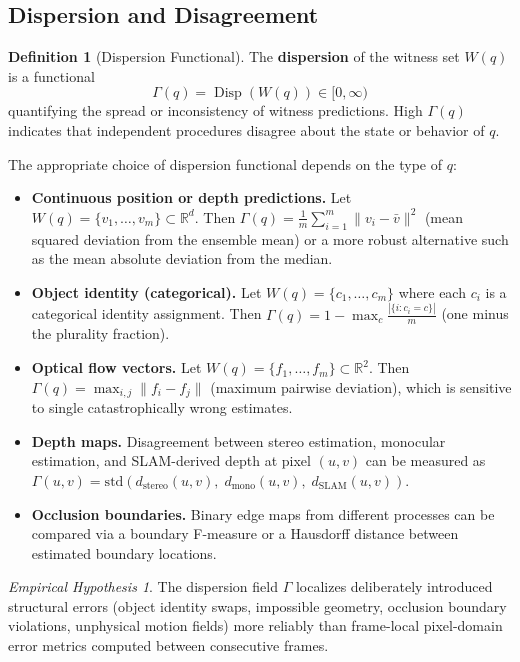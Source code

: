 \documentclass[12pt,a4paper]{article}
\theoremstyle{plain}
\theoremstyle{definition}
\newtheorem{definition}[theorem]{Definition}
\theoremstyle{remark}
\newtheorem{hypothesis}[theorem]{Empirical Hypothesis}
\DeclareMathOperator{\Disp}{Disp}
\begin{document}
\subsection{Dispersion and Disagreement}

\begin{definition}[Dispersion Functional]
The \textbf{dispersion} of the witness set $W(q)$ is a functional
\[
\Gamma(q) = \Disp(W(q)) \in [0, \infty)
\]
quantifying the spread or inconsistency of witness predictions. High $\Gamma(q)$ indicates that independent procedures disagree about the state or behavior of $q$.
\end{definition}

The appropriate choice of dispersion functional depends on the type of $q$:

\begin{itemize}[leftmargin=2em,itemsep=2pt]
\item \textbf{Continuous position or depth predictions.} Let $W(q) = \{v_1, \ldots, v_m\} \subset \mathbb{R}^d$. Then $\Gamma(q) = \frac{1}{m}\sum_{i=1}^m \|v_i - \bar{v}\|^2$ (mean squared deviation from the ensemble mean) or a more robust alternative such as the mean absolute deviation from the median.

\item \textbf{Object identity (categorical).} Let $W(q) = \{c_1, \ldots, c_m\}$ where each $c_i$ is a categorical identity assignment. Then $\Gamma(q) = 1 - \max_c \frac{|\{i : c_i = c\}|}{m}$ (one minus the plurality fraction).

\item \textbf{Optical flow vectors.} Let $W(q) = \{f_1, \ldots, f_m\} \subset \mathbb{R}^2$. Then $\Gamma(q) = \max_{i,j} \|f_i - f_j\|$ (maximum pairwise deviation), which is sensitive to single catastrophically wrong estimates.

\item \textbf{Depth maps.} Disagreement between stereo estimation, monocular estimation, and SLAM-derived depth at pixel $(u,v)$ can be measured as $\Gamma(u,v) = \mathrm{std}(d_{\text{stereo}}(u,v),\; d_{\text{mono}}(u,v),\; d_{\text{SLAM}}(u,v))$.

\item \textbf{Occlusion boundaries.} Binary edge maps from different processes can be compared via a boundary F-measure or a Hausdorff distance between estimated boundary locations.
\end{itemize}

\begin{hypothesis}
\label{hyp:gamma}
The dispersion field $\Gamma$ localizes deliberately introduced structural errors (object identity swaps, impossible geometry, occlusion boundary violations, unphysical motion fields) more reliably than frame-local pixel-domain error metrics computed between consecutive frames.
\end{hypothesis}
\end{document}
